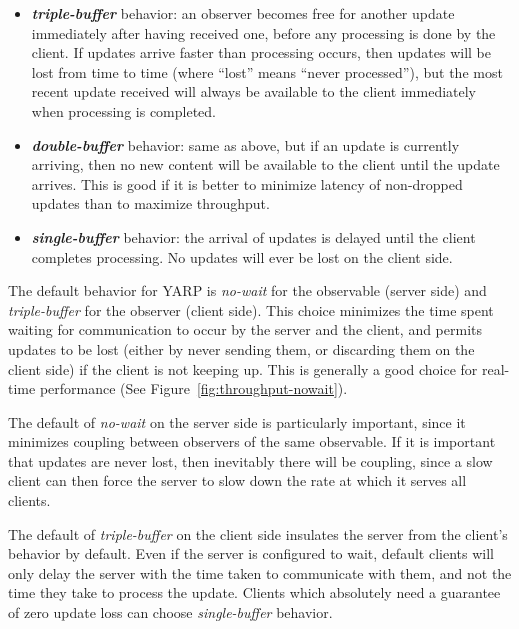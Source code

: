 \begin{itemize} \pflist

\item \textbf{\textit{triple-buffer}} behavior: an observer becomes free for
another update immediately after having received one, before any
processing is done by the client.  If updates arrive faster than
processing occurs, then updates will be lost from time to time (where
``lost'' means ``never processed''), but the most recent update
received will always be available to the client immediately when processing
is completed.

\item \textbf{\textit{double-buffer}} behavior: same as above, but if
an update is currently arriving, then no new content will be available
to the client until the update arrives.  This is good if it is better
to minimize latency of non-dropped updates than to maximize
throughput.

\item \textbf{\textit{single-buffer}} behavior: the arrival of updates
is delayed until the client completes processing.  No updates will ever be 
lost on the client side.


\end{itemize}

\noindent The default behavior for YARP is \textit{no-wait} for
the observable (server side) and \textit{triple-buffer} for 
the observer (client side).  This
choice minimizes the time spent waiting for communication to occur by
the server and the client, and permits updates to be lost (either by
never sending them, or discarding them on the client side) if the
client is not keeping up.  This is generally a good choice for
real-time performance  (See Figure~\ref{fig:throughput-nowait}).

The default of \textit{no-wait} on the server side is particularly
important, since it minimizes coupling between observers of the same
observable.  If it is important that updates are never lost, then
inevitably there will be coupling, since a slow client can then force
the server to slow down the rate at which it serves all clients.

The default of \textit{triple-buffer} on the client side insulates the
server from the client's behavior by default.  Even if the server is
configured to wait, default clients will only delay the server
with the time taken to communicate with them, and not the time
they take to process the update.  Clients which absolutely
need a guarantee of zero update loss can choose \textit{single-buffer}
behavior.
%


